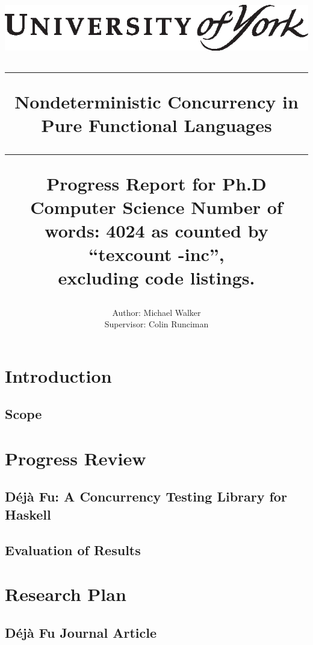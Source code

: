 \documentclass[10pt,a4paper,twoside,openany]{report}
\title{%
\includegraphics{university-of-york.eps}\\
\vspace{2em}
\hrule
\vspace{1em}
{\huge\bfseries Nondeterministic Concurrency in Pure Functional Languages}\\
\vspace{1em}
\hrule
\vspace{1em}
{\normalsize Progress Report for Ph.D Computer Science}
\vfill%
{\normalsize Number of words: 4024 as counted by ``texcount -inc'',\\
excluding code listings.}
}
\author{%
Author: Michael Walker\\
Supervisor: Colin Runciman
}
\date{}
\theoremstyle{example}
\newcommand{\dejafu}{D\'{e}j\`{a} Fu}
\begin{document}
\pagestyle{empty}

\maketitle

\begin{abstract}

\end{abstract}

\pagestyle{plain}
\setcounter{page}{1}
\tableofcontents
\clearpage



\chapter{Introduction}
\label{chp:intro}


  \section{Scope}
  \label{sec:intro-scope}
  

\chapter{Progress Review}
\label{chp:progress}


  \section{\dejafu{}: A Concurrency Testing Library for Haskell}
  \label{sec:progress-dejafu}
  

  \section{Evaluation of Results}
  \label{sec:progress-evaluation}
  

\chapter{Research Plan}
\label{chp:plan}


  \section{\dejafu{} Journal Article}
  \label{sec:plan-journal}
  
\end{document}
